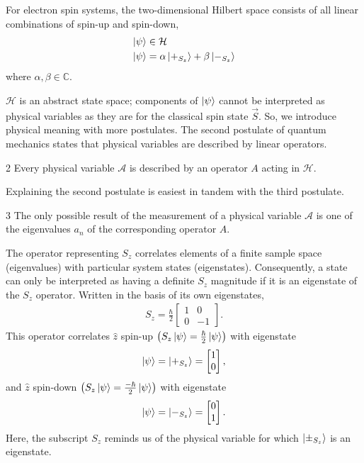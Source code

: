 For electron spin systems, the two-dimensional Hilbert space consists of all linear combinations of spin-up and spin-down,
\begin{align}
  \ket{\psi} &\in \mathcal{H} \\ \nonumber
  \ket{\psi} &= \alpha\ket{+_{S_z}} + \beta\ket{-_{S_z}}
\end{align}
where $\alpha, \beta \in \mathbb{C}$.

$\mathcal{H}$ is an abstract state space; components of $\ket{\psi}$ cannot be interpreted as physical variables as they are for the classical spin state $\vec{S}$. So, we introduce physical meaning with more postulates.
The second postulate of quantum mechanics states that physical variables are described by linear operators.
\begin{Thm:Postulate}{2}
    Every physical variable $\mathcal{A}$ is described by an operator $A$ acting in $\mathcal{H}$.
\end{Thm:Postulate}
Explaining the second postulate is easiest in tandem with the third postulate.
\begin{Thm:Postulate}{3}
    The only possible result of the measurement of a physical variable $\mathcal{A}$ is one of the eigenvalues $a_n$ of the corresponding operator $A$.
\end{Thm:Postulate}

The operator representing $S_z$ correlates elements of a finite sample space (eigenvalues) with particular system states (eigenstates). Consequently, a state can only be interpreted as having a definite $S_z$ magnitude if it is an eigenstate of the $S_z$ operator. Written in the basis of its own eigenstates,
\begin{align}
    S_z = \frac{\hbar}{2}\begin{bmatrix} 1 & 0 \\ 0 & -1 \end{bmatrix}.
\end{align}
This operator correlates $\hat{z}$ spin-up $\left(S_z \ket{\psi} = \frac{\hbar}{2}\ket{\psi}\right)$ with eigenstate
\begin{align} \label{eq:z up state}
    \ket{\psi} = \ket{+_{S_z}} = \begin{bmatrix} 1 \\ 0 \end{bmatrix},
\end{align}
and $\hat{z}$ spin-down $\left(S_z \ket{\psi} = \frac{-\hbar}{2}\ket{\psi}\right)$ with eigenstate
\begin{align}
    \ket{\psi} = \ket{-_{S_z}} = \begin{bmatrix} 0 \\ 1 \end{bmatrix}.
\end{align}
Here, the subscript $S_z$ reminds us of the physical variable for which $\ket{\pm_{S_z}}$ is an eigenstate.


